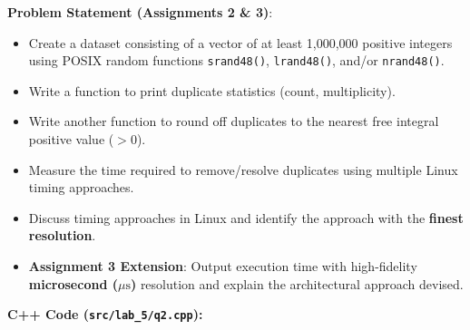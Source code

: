 \documentclass[12pt]{article}
\begin{document}
\textbf{Problem Statement (Assignments 2 \& 3)}:
\begin{itemize}
    \item Create a dataset consisting of a vector of at least 1,000,000 positive integers using POSIX random functions \texttt{srand48()}, \texttt{lrand48()}, and/or \texttt{nrand48()}.
    \item Write a function to print duplicate statistics (count, multiplicity).
    \item Write another function to round off duplicates to the nearest free integral positive value ($> 0$).
    \item Measure the time required to remove/resolve duplicates using multiple Linux timing approaches.
    \item Discuss timing approaches in Linux and identify the approach with the \textbf{finest resolution}.
    \item \textbf{Assignment 3 Extension}: Output execution time with high-fidelity \textbf{microsecond ($\mu\text{s}$)} resolution and explain the architectural approach devised.
\end{itemize}

\vspace{0.2cm}
\textbf{C++ Code (\texttt{src/lab\_5/q2.cpp}):}
\end{document}
